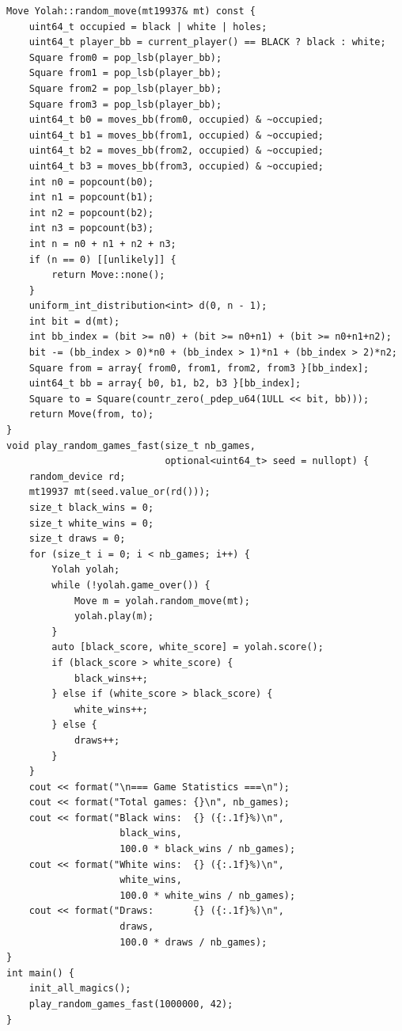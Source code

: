 \documentclass[12pt,a4paper,twoside,openright]{book}
\begin{document}
\begin{mdframed}[skipabove=\baselineskip,topline=false,rightline=false,bottomline=false,leftline=false,linewidth=1pt,linecolor=gray!40,innerleftmargin=8pt]
\begin{verbatim}
Move Yolah::random_move(mt19937& mt) const {
    uint64_t occupied = black | white | holes;
    uint64_t player_bb = current_player() == BLACK ? black : white;
    Square from0 = pop_lsb(player_bb);
    Square from1 = pop_lsb(player_bb);
    Square from2 = pop_lsb(player_bb);
    Square from3 = pop_lsb(player_bb);
    uint64_t b0 = moves_bb(from0, occupied) & ~occupied;
    uint64_t b1 = moves_bb(from1, occupied) & ~occupied;
    uint64_t b2 = moves_bb(from2, occupied) & ~occupied;
    uint64_t b3 = moves_bb(from3, occupied) & ~occupied;
    int n0 = popcount(b0);
    int n1 = popcount(b1);
    int n2 = popcount(b2);
    int n3 = popcount(b3);
    int n = n0 + n1 + n2 + n3;
    if (n == 0) [[unlikely]] {
        return Move::none();
    }
    uniform_int_distribution<int> d(0, n - 1);
    int bit = d(mt);
    int bb_index = (bit >= n0) + (bit >= n0+n1) + (bit >= n0+n1+n2);
    bit -= (bb_index > 0)*n0 + (bb_index > 1)*n1 + (bb_index > 2)*n2;
    Square from = array{ from0, from1, from2, from3 }[bb_index];
    uint64_t bb = array{ b0, b1, b2, b3 }[bb_index];        
    Square to = Square(countr_zero(_pdep_u64(1ULL << bit, bb)));
    return Move(from, to);     
}
void play_random_games_fast(size_t nb_games, 
                            optional<uint64_t> seed = nullopt) {
    random_device rd;
    mt19937 mt(seed.value_or(rd()));
    size_t black_wins = 0;
    size_t white_wins = 0;
    size_t draws = 0;
    for (size_t i = 0; i < nb_games; i++) {
        Yolah yolah;
        while (!yolah.game_over()) {
            Move m = yolah.random_move(mt);
            yolah.play(m);
        }
        auto [black_score, white_score] = yolah.score();
        if (black_score > white_score) {
            black_wins++;
        } else if (white_score > black_score) {
            white_wins++;
        } else {
            draws++;
        }
    }
    cout << format("\n=== Game Statistics ===\n");
    cout << format("Total games: {}\n", nb_games);
    cout << format("Black wins:  {} ({:.1f}%)\n", 
                    black_wins, 
                    100.0 * black_wins / nb_games);
    cout << format("White wins:  {} ({:.1f}%)\n", 
                    white_wins, 
                    100.0 * white_wins / nb_games);
    cout << format("Draws:       {} ({:.1f}%)\n", 
                    draws, 
                    100.0 * draws / nb_games);
}
int main() {
    init_all_magics();
    play_random_games_fast(1000000, 42);
}
\end{verbatim}
\label{lst:random_games_perf4}
\end{mdframed}
\end{document}

